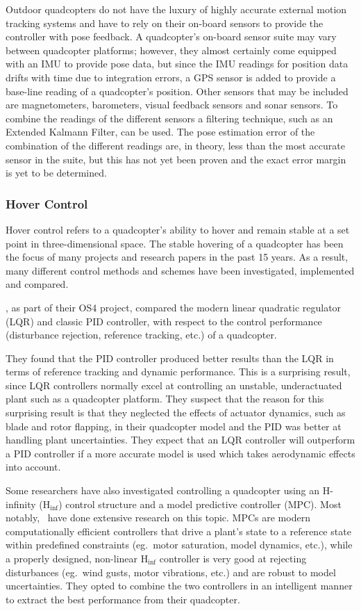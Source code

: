 Outdoor quadcopters do not have the luxury of highly accurate external motion tracking systems and have to rely on their on-board sensors to provide the controller with pose feedback. A quadcopter's on-board sensor suite may vary between quadcopter platforms; however, they almost certainly come equipped with an IMU to provide pose data, but since the IMU readings for position data drifts with time due to integration errors, a GPS sensor is added to provide a base-line reading of a quadcopter's position. Other sensors that may be included are magnetometers, barometers, visual feedback sensors and sonar sensors. To combine the readings of the different sensors a filtering technique, such as an Extended Kalmann Filter, can be used. The pose estimation error of the combination of the different readings are, in theory, less than the most accurate sensor in the suite, but this has not yet been proven and the exact error margin is yet to be determined. 

\subsubsection{Hover Control}

Hover control refers to a quadcopter's ability to hover and remain stable at a set point in three-dimensional space. The stable hovering of a quadcopter has been the focus of many projects and research papers in the past 15 years. As a result, many different control methods and schemes have been investigated, implemented and compared. 

\cite{bouabdallah2004pid}, as part of their OS4 project, compared the modern linear quadratic regulator (LQR) and classic PID controller, with respect to the control performance (disturbance rejection, reference tracking, etc.) of a quadcopter.

They found that the PID controller produced better results than the LQR in terms of reference tracking and dynamic performance. This is a surprising result, since LQR controllers normally excel at controlling an unstable, underactuated plant such as a quadcopter platform. They suspect that the reason for this surprising result is that they neglected the effects of actuator dynamics, such as blade and rotor flapping, in their quadcopter model and the PID was better at handling plant uncertainties. They expect that an LQR controller will outperform a PID controller if a more accurate model is used which takes aerodynamic effects into account. 

Some researchers have also investigated controlling a quadcopter using an H-infinity (H$_{\inf}$) control structure and a model predictive controller (MPC). Most notably,~\cite{raffo2010integral} have done extensive research on this topic. MPCs are modern computationally efficient controllers that drive a plant's state to a reference state within predefined constraints (eg.\ motor saturation, model dynamics, etc.), while a properly designed, non-linear H$_{\inf}$ controller is very good at rejecting disturbances (eg.\ wind gusts, motor vibrations, etc.) and are robust to model uncertainties. They opted to combine the two controllers in an intelligent manner to extract the best performance from their quadcopter. 

